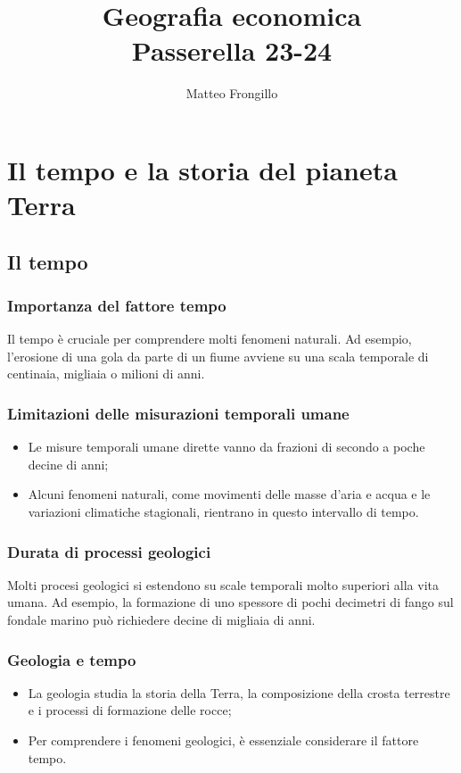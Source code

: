 \documentclass{article}
\title{\textbf{Geografia economica\\Passerella 23-24}}
\author{Matteo Frongillo}
\begin{document}
\maketitle
\tableofcontents

\newpage

\section{Il tempo e la storia del pianeta Terra}
\subsection{Il tempo}
\subsubsection{Importanza del fattore tempo}
Il tempo è cruciale per comprendere molti fenomeni naturali. Ad esempio, l'erosione di una gola
da parte di un fiume avviene su una scala temporale di centinaia, migliaia o milioni di anni.

\subsubsection{Limitazioni delle misurazioni temporali umane}
\begin{itemize}
    \item Le misure temporali umane dirette vanno da frazioni di secondo a poche decine di anni;
    \item Alcuni fenomeni naturali, come movimenti delle masse d'aria e acqua e le variazioni
        climatiche stagionali, rientrano in questo intervallo di tempo.
\end{itemize}

\subsubsection{Durata di processi geologici}
Molti procesi geologici si estendono su scale temporali molto superiori alla vita umana.
Ad esempio, la formazione di uno spessore di pochi decimetri di fango sul fondale marino può
richiedere decine di migliaia di anni.

\subsubsection{Geologia e tempo}
\begin{itemize}
    \item La geologia studia la storia della Terra, la composizione della crosta terrestre e i
        processi di formazione delle rocce;
    \item Per comprendere i fenomeni geologici, è essenziale considerare il fattore tempo.
\end{itemize}
\end{document}
